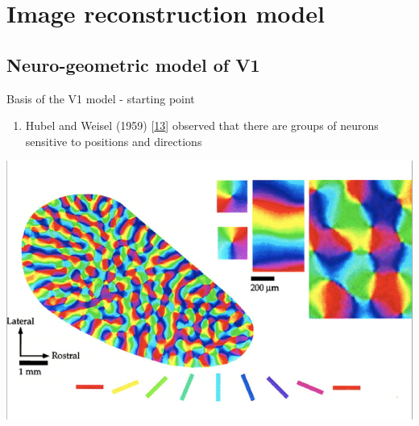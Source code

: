 \documentclass[10pt,american,ignorenonframetext,aspectratio=1610]{beamer}
\providecommand{\tightlist}{%
  \setlength{\itemsep}{0pt}\setlength{\parskip}{0pt}}
\theoremstyle{remark}
\begin{document}
\hypertarget{image-reconstruction-model}{%
\section{Image reconstruction model}\label{image-reconstruction-model}}

\hypertarget{neuro-geometric-model-of-v1}{%
\subsection{Neuro-geometric model of
V1}\label{neuro-geometric-model-of-v1}}

\begin{frame}{Basis of the V1 model - starting point}
\protect\hypertarget{basis-of-the-v1-model---starting-point}{}

\begin{enumerate}
\tightlist
\item
  Hubel and Weisel (1959) {[}\protect\hyperlink{ref-hubel1959}{13}{]}
  observed that there are groups of neurons sensitive to positions and
  directions
\end{enumerate}

\centering

\includegraphics[width=\textwidth,height=0.65\textheight]{img/hubel1959.jpg}

\end{frame}
\end{document}
